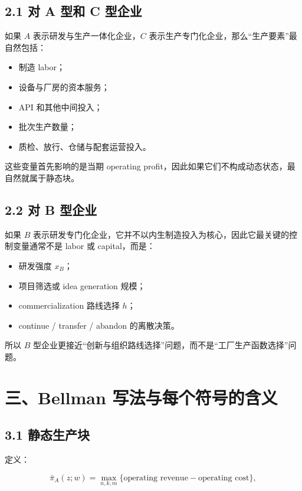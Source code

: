 \documentclass[12pt,fontset=none]{ctexart}
\begin{document}
\subsection{2.1 对 A 型和 C 型企业}

如果 \(A\) 表示研发与生产一体化企业，\(C\) 表示生产专门化企业，那么“生产要素”最自然包括：

\begin{itemize}[leftmargin=2em]
    \item 制造 labor；
    \item 设备与厂房的资本服务；
    \item API 和其他中间投入；
    \item 批次生产数量；
    \item 质检、放行、仓储与配套运营投入。
\end{itemize}

这些变量首先影响的是当期 operating profit，因此如果它们不构成动态状态，最自然就属于静态块。

\subsection{2.2 对 B 型企业}

如果 \(B\) 表示研发专门化企业，它并不以内生制造投入为核心，因此它最关键的控制变量通常不是 labor 或 capital，而是：

\begin{itemize}[leftmargin=2em]
    \item 研发强度 \(x_B\)；
    \item 项目筛选或 idea generation 规模；
    \item commercialization 路线选择 \(h\)；
    \item continue / transfer / abandon 的离散决策。
\end{itemize}

所以 \(B\) 型企业更接近“创新与组织路线选择”问题，而不是“工厂生产函数选择”问题。

\section{三、Bellman 写法与每个符号的含义}

\subsection{3.1 静态生产块}

定义：

\[
\bar{\pi}_A(z;w)
=
\max_{n,k,m}
\{\text{operating revenue}-\text{operating cost}\},
\]
\end{document}
